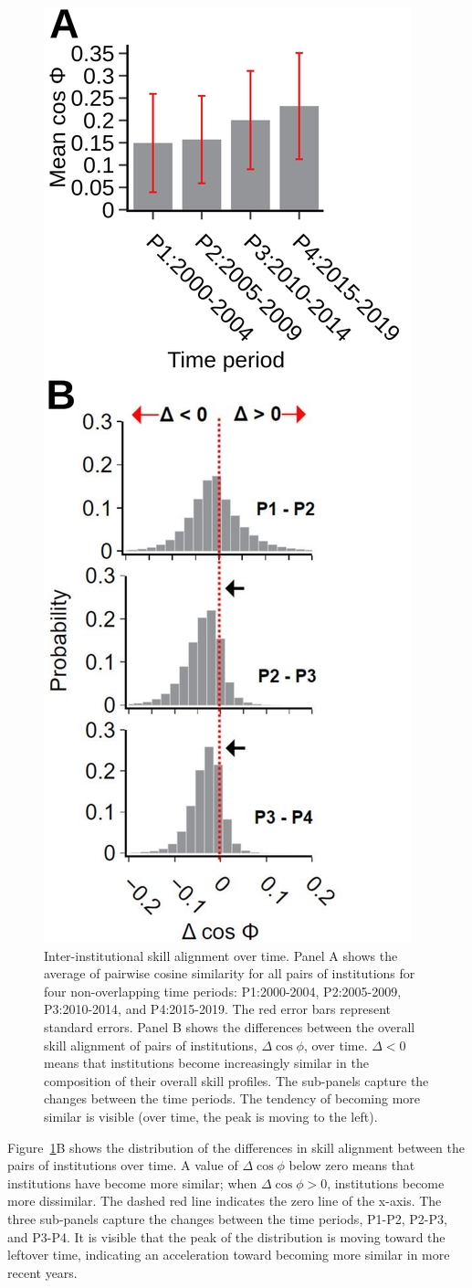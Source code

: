 \documentclass[draft,final]{vutinfth} %
\begin{document}
\begin{figure} [!ht] %
\centering
\includegraphics[width=0.4\linewidth]{figures_alignment/figure5ab.PNG}
\caption{Inter-institutional skill alignment over time. Panel A shows the average of pairwise cosine similarity for all pairs of institutions for four non-overlapping time periods: P1:2000-2004, P2:2005-2009, P3:2010-2014, and P4:2015-2019. The red error bars represent standard errors. Panel B shows the differences between the overall skill alignment of pairs of institutions, $\Delta\cos{\phi}$, over time. $\Delta<0$ means that institutions become increasingly similar in the composition of their overall skill profiles. The sub-panels capture the changes between the time periods. The tendency of becoming more similar is visible (over time, the peak is moving to the left).}
\label{fig5:figure5ab.PNG}
\end{figure}

Figure~\ref{fig5:figure5ab.PNG}B shows the distribution of the differences in skill alignment between the pairs of institutions over time. A value of $\Delta \cos{\phi}$  below zero means that institutions have become more similar; when $\Delta \cos{\phi} >0$, institutions become more dissimilar. The dashed red line indicates the zero line of the x-axis. The three sub-panels capture the changes between the time periods, P1-P2, P2-P3, and P3-P4. It is visible that the peak of the distribution is moving toward the leftover time, indicating an acceleration toward becoming more similar in more recent years.
\end{document}
